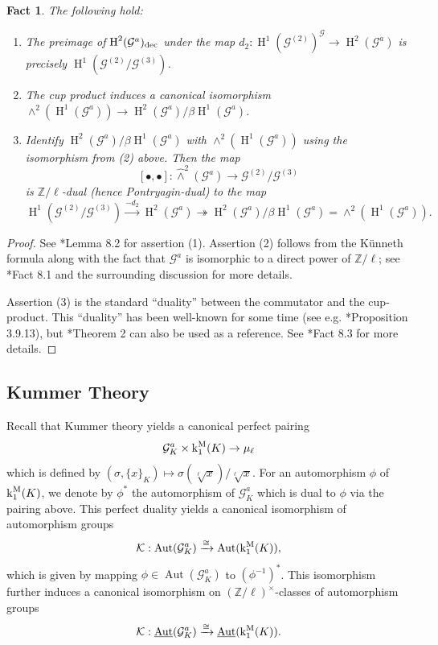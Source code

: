 \documentclass[11pt]{amsart}
\newtheorem{fact}[proposition]{Fact}
\theoremstyle{definition}
\theoremstyle{remark}
\numberwithin{equation}{section}
\DeclareMathOperator{\Aut}{Aut}
\renewcommand{\H}{\operatorname{H}}
\newcommand{\Z}{\mathbb{Z}}
\newcommand{\Gc}{\mathcal{G}}
\newcommand{\Kummer}{\mathcal{K}}
\newcommand{\UAut}{\underline{\Aut}}
\renewcommand{\k}{\operatorname{k}^{\rm M}}
\begin{document}
\begin{fact}
\label{fact: cohom / generalities / cup-vs-commutator}
  The following hold:
  \begin{enumerate}
    \item The preimage of $\H^2(\Gc^a)_{\rm dec}$ under the map $d_2 : \H^1(\Gc^{(2)})^\Gc \rightarrow \H^2(\Gc^a)$ is precisely $\H^1(\Gc^{(2)}/\Gc^{(3)})$.
    \item The cup product induces a canonical isomorphism $\wedge^2(\H^1(\Gc^a)) \rightarrow \H^2(\Gc^a)/\beta\H^1(\Gc^a)$.
    \item Identify $\H^2(\Gc^a)/\beta\H^1(\Gc^a)$ with $\wedge^2(\H^1(\Gc^a))$ using the isomorphism from (2) above.
    Then the map 
    \[ [\bullet,\bullet] : \widehat\wedge^2(\Gc^a) \rightarrow \Gc^{(2)}/\Gc^{(3)} \]
    is $\Z/\ell$-dual (hence Pontryagin-dual) to the map 
    \[ \H^1(\Gc^{(2)}/\Gc^{(3)}) \xrightarrow{-d_2} \H^2(\Gc^a) \twoheadrightarrow \H^2(\Gc^a)/\beta\H^1(\Gc^a) = \wedge^2(\H^1(\Gc^a)). \]
  \end{enumerate}
\end{fact}
\begin{proof}
  See \cite{Topaz:2014}*{Lemma 8.2} for assertion (1).
  Assertion (2) follows from the K\"unneth formula along with the fact that $\Gc^a$ is isomorphic to a direct power of $\Z/\ell$; see \cite{Topaz:2014}*{Fact 8.1} and the surrounding discussion for more details.

  Assertion (3) is the standard ``duality'' between the commutator and the cup-product.
  This ``duality'' has been well-known for some time (see e.g. \cite{Neukirch:2013}*{Proposition 3.9.13}), but \cite{Topaz:2015b}*{Theorem 2} can also be used as a reference.
  See \cite{Topaz:2014}*{Fact 8.3} for more details.
\end{proof}

\subsection{Kummer Theory}
\label{subsection: cohom / kummer}

Recall that Kummer theory yields a canonical perfect pairing 
\[ \Gc_K^a \times \k_1(K) \rightarrow \mu_\ell \]
which is defined by $(\sigma,\{x\}_K) \mapsto \sigma(\sqrt[\ell]{x})/\sqrt[\ell]{x}$.
For an automorphism $\phi$ of $\k_1(K)$, we denote by $\phi^*$ the automorphism of $\Gc_K^a$ which is dual to $\phi$ via the pairing above.
This perfect duality yields a canonical isomorphism of automorphism groups
\[\Kummer : \Aut(\Gc_K^a) \xrightarrow{\cong} \Aut(\k_1(K)), \]
which is given by mapping $\phi \in \Aut(\Gc_K^a)$ to $(\phi^{-1})^*$.
This isomorphism further induces a canonical isomorphism on $(\Z/\ell)^\times$-classes of automorphism groups
\[ \Kummer : \UAut(\Gc_K^a) \xrightarrow{\cong} \UAut(\k_1(K)). \]
\end{document}
